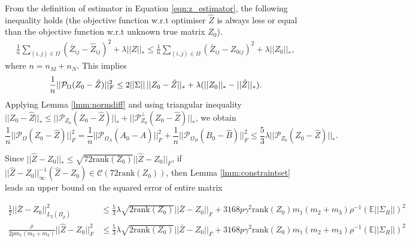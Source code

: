 \documentclass{article} %
\newcommand\mc{\mathcal} %
\begin{document}
From the definition of estimator in Equation \ref{eqn:z_estimator}, the following inequality holds (the objective function  w.r.t optimiser $\hat{Z}$ is always less or equal than the objective function w.r.t unknown true matrix $Z_0$).
\begin{align}
\frac{1}{n} \sum_{(i,j) \in \Omega}(\bar{Z}_{ij} - \hat{Z}_{ij})^2 + \lambda ||\hat{Z}||_* 
\leq \frac{1}{n} \sum_{(i,j) \in \Omega}(\bar{Z}_{ij} - {Z}_{0ij})^2 + \lambda ||Z_0||_*,
\end{align}
where $n = n_M + n_N$. This implies
\begin{equation}
\frac{1}{n}||\mathcal{P}_\Omega(Z_0 - \hat{Z}) ||_F^2 \leq 2||\Sigma||\,||Z_0 - \hat{Z}||_* + \lambda(||Z_0||_* - ||\hat{Z}||_*). \\
\end{equation}
Applying Lemma \ref{lmm:normdiff} and using triangular inequality $||Z_0 - \hat{Z}||_* \leq ||\mc{P}_{Z_0}(Z_0 - \hat{Z})||_* + ||\mc{P}_{Z_0}^\perp(Z_0 - \hat{Z})||_*$, we obtain
\begin{equation}
\frac{1}{n}||\mathcal{P}_\Omega(Z_0 - \hat{Z}) ||_F^2 = \frac{1}{n}||\mc{P}_{\Omega_A}(A_0-\hat{A})||_F^2 + \frac{1}{n}||\mc{P}_{\Omega_B}(B_0-\hat{B})||_F^2
\leq \frac{5}{3}\lambda ||\mc{P}_{Z_0}(Z_0-\hat{Z})||_*.
\label{eqn:tri}
\end{equation}

Since $||\hat{Z} - Z_0||_* \leq \sqrt{72\text{rank}(Z_0)}||\hat{Z} - Z_0||_F$, if $||\hat{Z}-Z_0||_\infty^{-1}(\hat{Z}-Z_0) \in \mc{C}(72\text{rank}(Z_0))$, then Lemma \ref{lmm:constraintset} leads an upper bound on the squared error of entire matrix

\begin{align}
\frac{1}{2}||\bar{Z}-Z_0||_{L_2(\Pi_\rho)}^2 &\leq \frac{5}{3}\lambda\sqrt{2\text{rank}(Z_0)}||\bar{Z} - Z_0||_F + 3168p\gamma^2\text{rank}(Z_0)m_1(m_2+m_3)\rho^{-1}(\mathbb{E}||\Sigma_R||)^2\\
\frac{\rho}{2pm_1(m_2+m_3)} ||\hat{Z} - Z_0||_F^2 &\leq \frac{5}{3}\lambda\sqrt{2\text{rank}(Z_0)}||\bar{Z} - Z_0||_F + 3168p\gamma^2\text{rank}(Z_0)m_1(m_2+m_3)\rho^{-1}(\mathbb{E}||\Sigma_R||)^2\\
\end{align}
\end{document}
